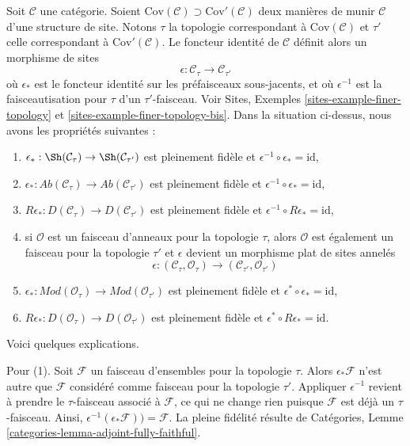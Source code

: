\noindent
Soit $\mathcal{C}$ une catégorie. Soient
$\text{Cov}(\mathcal{C}) \supset \text{Cov}'(\mathcal{C})$
deux manières de munir $\mathcal{C}$ d'une structure de site. Notons
$\tau$ la topologie correspondant à $\text{Cov}(\mathcal{C})$ et $\tau'$
celle correspondant à $\text{Cov}'(\mathcal{C})$. Le foncteur identité de
$\mathcal{C}$ définit alors un morphisme de sites
$$
\epsilon : \mathcal{C}_\tau \longrightarrow \mathcal{C}_{\tau'}
$$
où $\epsilon_*$ est le foncteur identité sur les préfaisceaux sous-jacents,
et où $\epsilon^{-1}$ est la faisceautisation pour $\tau$ d'un
$\tau'$-faisceau. Voir Sites, Exemples
\ref{sites-example-finer-topology} et
\ref{sites-example-finer-topology-bis}. Dans la situation ci-dessus, nous
avons les propriétés suivantes :
\begin{enumerate}
\item $\epsilon_* : \Sh(\mathcal{C}_\tau) \to \Sh(\mathcal{C}_{\tau'})$
est pleinement fidèle et $\epsilon^{-1} \circ \epsilon_* = \text{id}$,
\item $\epsilon_* : \textit{Ab}(\mathcal{C}_\tau) \to
\textit{Ab}(\mathcal{C}_{\tau'})$
est pleinement fidèle et $\epsilon^{-1} \circ \epsilon_* = \text{id}$,
\item $R\epsilon_* : D(\mathcal{C}_\tau) \to D(\mathcal{C}_{\tau'})$
est pleinement fidèle et $\epsilon^{-1} \circ R\epsilon_* = \text{id}$,
\item si $\mathcal{O}$ est un faisceau d'anneaux pour la topologie $\tau$,
alors $\mathcal{O}$ est également un faisceau pour la topologie $\tau'$ et
$\epsilon$ devient un morphisme plat de sites annelés
$$
\epsilon :
(\mathcal{C}_\tau, \mathcal{O}_\tau)
\longrightarrow
(\mathcal{C}_{\tau'}, \mathcal{O}_{\tau'})
$$
\item $\epsilon_* : \textit{Mod}(\mathcal{O}_\tau) \to
\textit{Mod}(\mathcal{O}_{\tau'})$ est pleinement fidèle et
$\epsilon^* \circ \epsilon_* = \text{id}$,
\item $R\epsilon_* : D(\mathcal{O}_\tau) \to D(\mathcal{O}_{\tau'})$
est pleinement fidèle et $\epsilon^* \circ R\epsilon_* = \text{id}$.
\end{enumerate}
Voici quelques explications.

\medskip\noindent
Pour (1). Soit $\mathcal{F}$ un faisceau d'ensembles pour la topologie
$\tau$. Alors $\epsilon_*\mathcal{F}$ n'est autre que $\mathcal{F}$
considéré comme faisceau pour la topologie $\tau'$. Appliquer
$\epsilon^{-1}$ revient à prendre le $\tau$-faisceau associé à
$\mathcal{F}$, ce qui ne change rien puisque $\mathcal{F}$ est déjà un
$\tau$-faisceau. Ainsi,
$\epsilon^{-1}(\epsilon_*\mathcal{F})) = \mathcal{F}$. La pleine fidélité
résulte de Catégories, Lemme
\ref{categories-lemma-adjoint-fully-faithful}.

